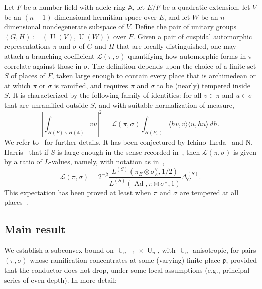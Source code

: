 \documentclass[reqno]{amsart}
\DeclareMathOperator{\Ad}{Ad}
\DeclareMathOperator{\U}{U}
\theoremstyle{plain} \newtheorem{theorem} {Theorem} \newtheorem{conjecture} {Conjecture} \newtheorem{corollary} [theorem] {Corollary} \newtheorem{proposition} [theorem] {Proposition} \newtheorem{fact} [theorem] {Fact}
\theoremstyle{definition} \newtheorem{definition} [theorem] {Definition}
\theoremstyle{itplain} %
\begin{document}
Let $F$ be a number field with adele ring $\mathbb{A}$, let $E/F$ be a quadratic extension, let $V$ be an $(n+1)$-dimensional hermitian space over $E$, and let $W$ be an $n$-dimensional nondegenerate subspace of $V$.  Define the pair of unitary groups $(G,H) := (\U(V), \U(W))$ over $F$.  Given a pair of cuspidal automorphic representations $\pi$ and $\sigma$ of $G$ and $H$ that are locally distinguished, one may attach a branching coefficient $\mathcal{L}(\pi,\sigma)$ quantifying how automorphic forms in $\pi$ correlate against those in $\sigma$.  The definition depends upon the choice of a finite set $S$ of places of $F$, taken large enough to contain every place that is archimedean or at which $\pi$ or $\sigma$ is ramified, and requires $\pi$ and $\sigma$ to be (nearly) tempered inside $S$.  It is characterized by the following family of identities: for all $v \in \pi $ and $u \in \sigma$ that are unramified outside $S$, and with suitable normalization of measure,
\begin{equation}\label{eq:cj3tfrrhlc}
  \left\lvert \int_{H(F) \backslash H(\mathbb{A})} v \bar{u}
   \right\rvert^2
   =
   \mathcal{L}(\pi, \sigma)
  \int_{H(F_S)} \langle h v, v   \rangle \langle u, h u \rangle \, d h.
\end{equation}
We refer to~\cite[\S3.7]{2020arXiv201202187N} for further details. It has been conjectured by Ichino--Ikeda~\cite{MR2585578} and N. Harris~\cite{MR3159075} that if $S$ is large enough in the sense recorded in~\cite[\S1]{MR2585578}, then $\mathcal{L}(\pi,\sigma)$ is given by a ratio of $L$-values, namely, with notation as in~\cite{MR4426741},
\begin{equation}\label{eqn:20230517061322}
  \mathcal{L}(\pi,\sigma)
  =
  2^{- \beta}
  \frac{L^{(S)}(\pi_E \otimes  \sigma_E^{\vee},1/2)}{L^{(S)}(\Ad, \pi \boxtimes {\sigma}^{\vee},1)}
  \Delta_G^{(S)}.
\end{equation}
This expectation has been proved at least when $\pi$ and $\sigma$ are tempered at all places~\cite{MR4426741}.


\subsection{Main result}\label{sec:cj4vjf3x2x}
We establish a subconvex bound on $\U_{n+1} \times \U_n$, with $\U_n$ anisotropic, for pairs $(\pi,\sigma)$ whose ramification concentrates at some (varying) finite place $\mathfrak{p}$, provided that the conductor does not drop, under some local assumptions (e.g., principal series of even depth).  In more detail:
\end{document}
